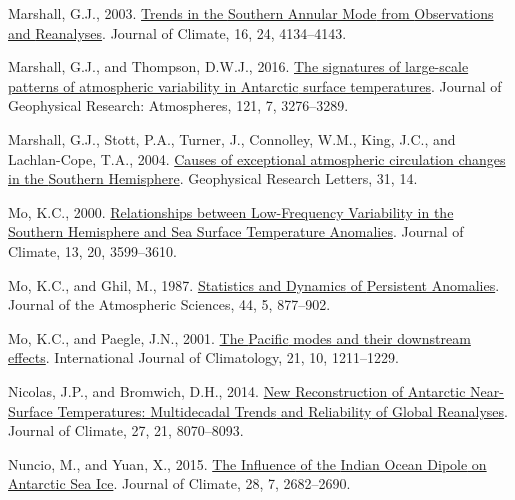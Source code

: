 \documentclass[12pt,oneside]{reedthesis}
\newlength{\cslhangindent}
\newenvironment{CSLReferences}[2] %
 {%
  \setlength{\parindent}{0pt}
  \ifodd #1 \everypar{\setlength{\hangindent}{\cslhangindent}}\ignorespaces\fi
  \ifnum #2 > 0
  \setlength{\parskip}{#2\baselineskip}
  \fi
 }%
 {}
\begin{document}
\begin{CSLReferences}{1}{0}
\leavevmode{}%
Marshall, G.J., 2003. \href{https://doi.org/10.1175/1520-0442(2003)016\%3C4134:TITSAM\%3E2.0.CO;2}{Trends in the {Southern Annular Mode} from {Observations} and {Reanalyses}}. Journal of Climate, 16, 24, 4134--4143.

\leavevmode{}%
Marshall, G.J., and Thompson, D.W.J., 2016. \href{https://doi.org/10.1002/2015JD024665}{The signatures of large-scale patterns of atmospheric variability in {Antarctic} surface temperatures}. Journal of Geophysical Research: Atmospheres, 121, 7, 3276--3289.

\leavevmode{}%
Marshall, G.J., Stott, P.A., Turner, J., Connolley, W.M., King, J.C., and Lachlan-Cope, T.A., 2004. \href{https://doi.org/10.1029/2004GL019952}{Causes of exceptional atmospheric circulation changes in the {Southern Hemisphere}}. Geophysical Research Letters, 31, 14.

\leavevmode{}%
Mo, K.C., 2000. \href{https://doi.org/10.1175/1520-0442(2000)013\%3C3599:RBLFVI\%3E2.0.CO;2}{Relationships between {Low-Frequency Variability} in the {Southern Hemisphere} and {Sea Surface Temperature Anomalies}}. Journal of Climate, 13, 20, 3599--3610.

\leavevmode{}%
Mo, K.C., and Ghil, M., 1987. \href{https://doi.org/10.1175/1520-0469(1987)044\%3C0877:SADOPA\%3E2.0.CO;2}{Statistics and {Dynamics} of {Persistent Anomalies}}. Journal of the Atmospheric Sciences, 44, 5, 877--902.

\leavevmode{}%
Mo, K.C., and Paegle, J.N., 2001. \href{https://doi.org/10.1002/joc.685}{The {Pacific} modes and their downstream effects}. International Journal of Climatology, 21, 10, 1211--1229.

\leavevmode{}%
Nicolas, J.P., and Bromwich, D.H., 2014. \href{https://doi.org/10.1175/JCLI-D-13-00733.1}{New {Reconstruction} of {Antarctic Near-Surface Temperatures}: {Multidecadal Trends} and {Reliability} of {Global Reanalyses}}. Journal of Climate, 27, 21, 8070--8093.

\leavevmode{}%
Nuncio, M., and Yuan, X., 2015. \href{https://doi.org/10.1175/JCLI-D-14-00390.1}{The {Influence} of the {Indian Ocean Dipole} on {Antarctic Sea Ice}}. Journal of Climate, 28, 7, 2682--2690.


\end{CSLReferences}
\end{document}
